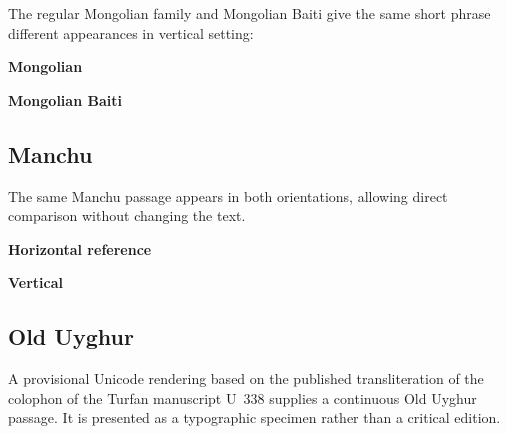 \documentclass[11pt,twoside]{impeart}
\begin{document}
\medskip

The regular Mongolian family and Mongolian Baiti give the same short
phrase different appearances in vertical setting:

\noindent
\begin{minipage}[t]{0.47\linewidth}
\raggedright
\textbf{Mongolian}

\medskip

\end{minipage}
\hfill
\begin{minipage}[t]{0.47\linewidth}
\raggedright
\textbf{Mongolian Baiti}

\medskip

\end{minipage}

\bigskip

\subsection{Manchu}

The same Manchu passage appears in both orientations, allowing direct
comparison without changing the text.

\noindent
\begin{minipage}[t]{0.47\linewidth}
\raggedright
\textbf{Horizontal reference}

\medskip

\end{minipage}
\hfill
\begin{minipage}[t]{0.47\linewidth}
\raggedright
\textbf{Vertical}

\medskip

\end{minipage}

\bigskip

\subsection{Old Uyghur}

A provisional Unicode rendering based on the published transliteration
of the colophon of the Turfan manuscript U~338 supplies a continuous
Old Uyghur passage. It is presented as a typographic specimen rather
than a critical edition.
\end{document}
